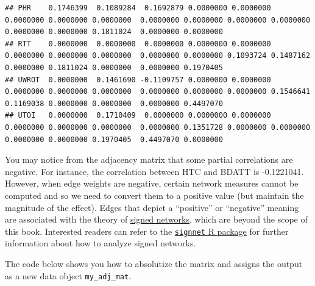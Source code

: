 \documentclass[
]{book}
\newenvironment{Shaded}{\begin{snugshade}}{\end{snugshade}}
\newcommand{\CommentTok}[1]{\textcolor[rgb]{0.56,0.35,0.01}{\textit{#1}}}
\newcommand{\DecValTok}[1]{\textcolor[rgb]{0.00,0.00,0.81}{#1}}
\newcommand{\FunctionTok}[1]{\textcolor[rgb]{0.13,0.29,0.53}{\textbf{#1}}}
\newcommand{\NormalTok}[1]{#1}
\newcommand{\OtherTok}[1]{\textcolor[rgb]{0.56,0.35,0.01}{#1}}
\newcommand{\SpecialCharTok}[1]{\textcolor[rgb]{0.81,0.36,0.00}{\textbf{#1}}}
\begin{document}
\begin{verbatim}
## PHR    0.1746399  0.1089284  0.1692879 0.0000000 0.0000000 0.0000000 0.0000000 0.0000000  0.0000000 0.0000000 0.0000000 0.0000000 0.0000000 0.0000000 0.1811024  0.0000000 0.0000000
## RTT    0.0000000  0.0000000  0.0000000 0.0000000 0.0000000 0.0000000 0.0000000 0.0000000  0.0000000 0.0000000 0.1093724 0.1487162 0.0000000 0.1811024 0.0000000  0.0000000 0.1970405
## UWROT  0.0000000  0.1461690 -0.1109757 0.0000000 0.0000000 0.0000000 0.0000000 0.0000000  0.0000000 0.0000000 0.0000000 0.1546641 0.1169038 0.0000000 0.0000000  0.0000000 0.4497070
## UTOI   0.0000000  0.1710409  0.0000000 0.0000000 0.0000000 0.0000000 0.0000000 0.0000000  0.0000000 0.1351728 0.0000000 0.0000000 0.0000000 0.0000000 0.1970405  0.4497070 0.0000000
\end{verbatim}

You may notice from the adjacency matrix that some partial correlations are negative. For instance, the correlation between HTC and BDATT is -0.1221041. However, when edge weights are negative, certain network measures cannot be computed and so we need to convert them to a positive value (but maintain the magnitude of the effect). Edges that depict a ``positive'' or ``negative'' meaning are associated with the theory of \href{https://en.wikipedia.org/wiki/Signed_network}{signed networks}, which are beyond the scope of this book. Interested readers can refer to the \href{https://www.r-bloggers.com/2020/01/a-package-for-analysing-signed-networks/}{\texttt{signnet} R package} for further information about how to analyze signed networks.

The code below shows you how to absolutize the matrix and assigns the output as a new data object \texttt{my\_adj\_mat}.

\begin{Shaded}
\end{Shaded}
\end{document}
